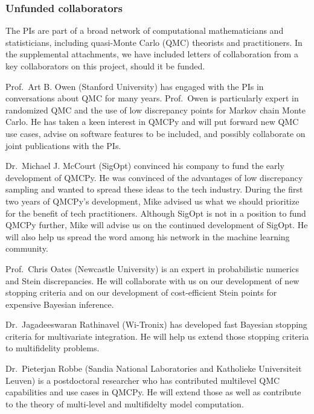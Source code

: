 \documentclass[11pt]{NSFamsart}
\begin{document}
\subsubsection*{Unfunded collaborators} The PIs are part of a broad network of computational mathematicians and statisticians, including quasi-Monte Carlo (QMC) theorists and practitioners.  In the supplemental attachments, we have included letters of collaboration from a key collaborators on this project, should it be funded.

Prof.\ Art B. Owen (Stanford University) has engaged with the PIs in conversations about QMC for many years.  Prof.\ Owen is particularly expert in randomized QMC and the use of low discrepancy points for Markov chain Monte Carlo.  He has taken a keen interest in QMCPy and will put forward new QMC use cases, advise on software features to be included, and possibly collaborate on joint publications with the PIs. 

Dr.\ Michael J. McCourt (SigOpt) convinced his company to fund the early development of QMCPy.  He was convinced of the advantages of low discrepancy sampling and wanted to spread these ideas to the tech industry.  During the first two years of QMCPy's development, Mike advised us what we should prioritize for the benefit of tech practitioners.  Although SigOpt is not in a position to fund QMCPy further, Mike will advise us on the continued development of SigOpt.  He will also help us spread the word among his network in the machine learning community.


Prof.\ Chris Oates (Newcastle University) is an expert in probabilistic numerics and Stein discrepancies.  He will collaborate with us on our development of new stopping criteria and on our development of cost-efficient Stein points for expensive Bayesian inference.

Dr.\ Jagadeeswaran Rathinavel (Wi-Tronix) has developed fast Bayesian stopping criteria for multivariate integration.  He will help us extend those stopping criteria to multifidelity problems.

Dr.\ Pieterjan Robbe (Sandia National Laboratories and Katholieke Universiteit Leuven) is a postdoctoral researcher who has contributed multilevel QMC capabilities and use cases in QMCPy.  He will extend those as well as contribute to the theory of multi-level and multifidelty model computation.
\end{document}
